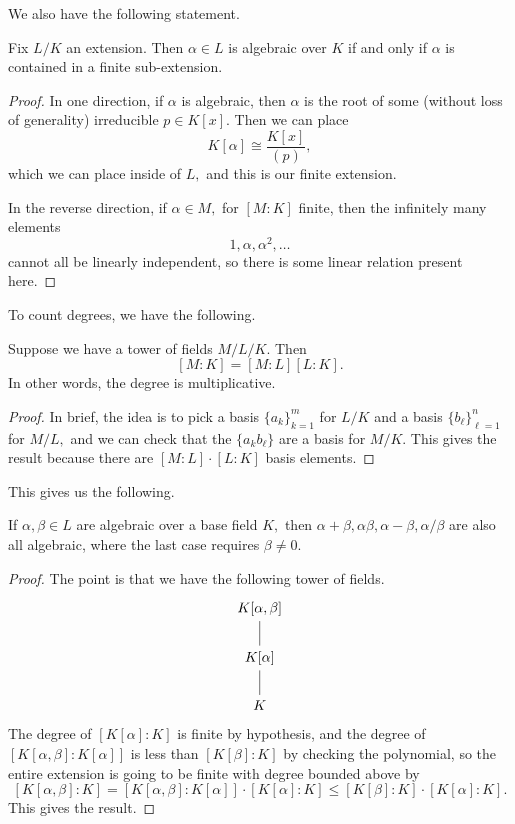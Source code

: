 \documentclass[../notes.tex]{subfiles}
\begin{document}
We also have the following statement.
\begin{proposition}
	Fix $L/K$ an extension. Then $\alpha\in L$ is algebraic over $K$ if and only if $\alpha$ is contained in a finite sub-extension.
\end{proposition}
\begin{proof}
	In one direction, if $\alpha$ is algebraic, then $\alpha$ is the root of some (without loss of generality) irreducible $p\in K[x].$ Then we can place
	\[K[\alpha]\cong\frac{K[x]}{(p)},\]
	which we can place inside of $L,$ and this is our finite extension.

	In the reverse direction, if $\alpha\in M,$ for $[M:K]$ finite, then the infinitely many elements
	\[1,\alpha,\alpha^2,\ldots\]
	cannot all be linearly independent, so there is some linear relation present here.
\end{proof}
To count degrees, we have the following.
\begin{proposition}
	Suppose we have a tower of fields $M/L/K.$ Then
	\[[M:K]=[M:L][L:K].\]
	In other words, the degree is multiplicative.
\end{proposition}
\begin{proof}
	In brief, the idea is to pick a basis $\{a_k\}_{k=1}^m$ for $L/K$ and a basis $\{b_\ell\}_{\ell=1}^n$ for $M/L,$ and we can check that the $\{a_kb_\ell\}$ are a basis for $M/K.$ This gives the result because there are $[M:L]\cdot[L:K]$ basis elements.
\end{proof}
This gives us the following.
\begin{proposition}
	If $\alpha,\beta\in L$ are algebraic over a base field $K,$ then $\alpha+\beta,\alpha\beta,\alpha-\beta,\alpha/\beta$ are also all algebraic, where the last case requires $\beta\ne0.$
\end{proposition}
\begin{proof}
	The point is that we have the following tower of fields.
	\[\begin{tikzcd}
		{K[\alpha,\beta]} \\
		{K[\alpha]} \\
		K
		\arrow[no head, from=1-1, to=2-1]
		\arrow[no head, from=2-1, to=3-1]
	\end{tikzcd}\]
	The degree of $[K[\alpha]:K]$ is finite by hypothesis, and the degree of $[K[\alpha,\beta]:K[\alpha]]$ is less than $[K[\beta]:K]$ by checking the polynomial, so the entire extension is going to be finite with degree bounded above by
	\[[K[\alpha,\beta]:K]=[K[\alpha,\beta]:K[\alpha]]\cdot[K[\alpha]:K]\le[K[\beta]:K]\cdot[K[\alpha]:K].\]
	This gives the result.
\end{proof}
\end{document}
